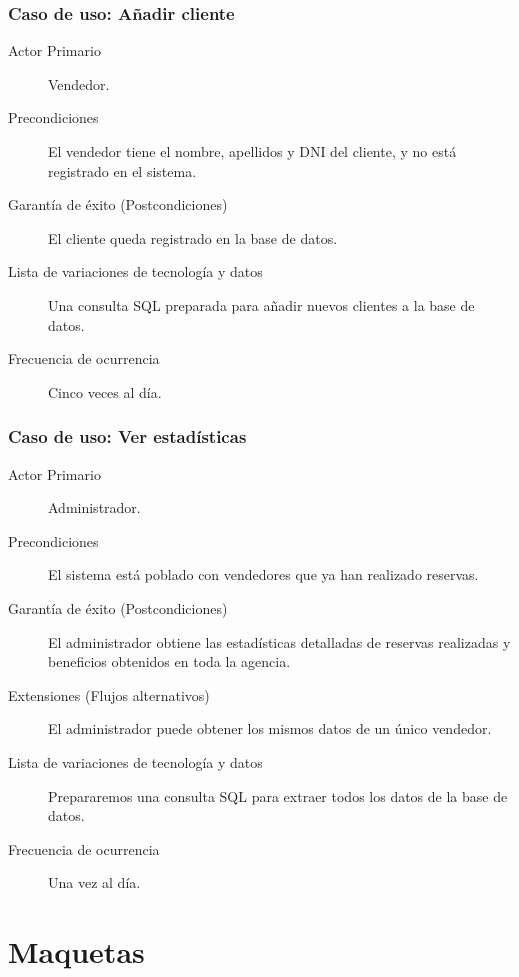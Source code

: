 \documentclass[12pt,a4paper,titlepage]{article}
\begin{document}
\subsubsection{Caso de uso: Añadir cliente}
\begin{description}
\item[Actor Primario] Vendedor.
\item[Precondiciones] El vendedor tiene el nombre, apellidos y DNI del cliente, y no está registrado en el sistema.
\item[Garantía de éxito (Postcondiciones)] El cliente queda registrado en la base de datos.
\item[Lista de variaciones de tecnología y datos] Una consulta SQL preparada para añadir nuevos clientes a la base de datos.
\item[Frecuencia de ocurrencia] Cinco veces al día.
\end{description}

\subsubsection{Caso de uso: Ver estadísticas}
\begin{description}
\item[Actor Primario] Administrador.
\item[Precondiciones] El sistema está poblado con vendedores que ya han realizado reservas.
\item[Garantía de éxito (Postcondiciones)] El administrador obtiene las estadísticas detalladas de reservas realizadas y beneficios obtenidos en toda la agencia.
\item[Extensiones (Flujos alternativos)] El administrador puede obtener los mismos datos de un único vendedor.
\item[Lista de variaciones de tecnología y datos] Prepararemos una consulta SQL para extraer todos los datos de la base de datos.
\item[Frecuencia de ocurrencia] Una vez al día.
\end{description}

\section{Maquetas}
\end{document}

